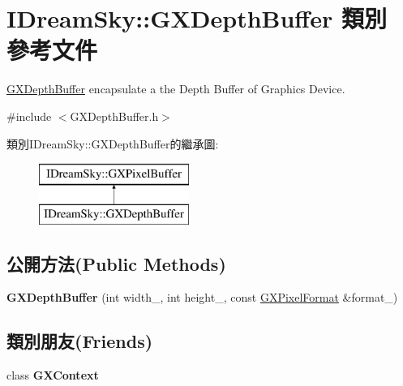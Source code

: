 \hypertarget{class_i_dream_sky_1_1_g_x_depth_buffer}{}\section{I\+Dream\+Sky\+:\+:G\+X\+Depth\+Buffer 類別 參考文件}
\label{class_i_dream_sky_1_1_g_x_depth_buffer}


\hyperlink{class_i_dream_sky_1_1_g_x_depth_buffer}{G\+X\+Depth\+Buffer} encapsulate a the Depth Buffer of Graphics Device.  




{\ttfamily \#include $<$G\+X\+Depth\+Buffer.\+h$>$}

類別\+I\+Dream\+Sky\+:\+:G\+X\+Depth\+Buffer的繼承圖\+:\begin{figure}[H]
\begin{center}
\leavevmode
\includegraphics[height=2.000000cm]{class_i_dream_sky_1_1_g_x_depth_buffer}
\end{center}
\end{figure}
\subsection*{公開方法(Public Methods)}
\begin{DoxyCompactItemize}
\item 
{\bfseries G\+X\+Depth\+Buffer} (int width\+\_\+, int height\+\_\+, const \hyperlink{class_i_dream_sky_1_1_g_x_pixel_format}{G\+X\+Pixel\+Format} \&format\+\_\+)\hypertarget{class_i_dream_sky_1_1_g_x_depth_buffer_acbd2237406bb10a696d1759f8bcaf494}{}\label{class_i_dream_sky_1_1_g_x_depth_buffer_acbd2237406bb10a696d1759f8bcaf494}

\end{DoxyCompactItemize}
\subsection*{類別朋友(Friends)}
\begin{DoxyCompactItemize}
\item 
class {\bfseries G\+X\+Context}\hypertarget{class_i_dream_sky_1_1_g_x_depth_buffer_a2c36d7f8865080802bbad88cd73d871c}{}\label{class_i_dream_sky_1_1_g_x_depth_buffer_a2c36d7f8865080802bbad88cd73d871c}

\end{DoxyCompactItemize}

